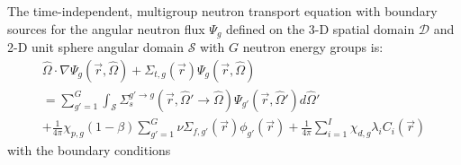 The time-independent, multigroup neutron transport equation with boundary sources for the angular
neutron flux $\Psi_g$ defined on the 3-D spatial domain $\mathcal{D}$ and 2-D unit sphere angular
domain $\mathcal{S}$ with $G$ neutron energy groups is:
%
\begin{multline}
  \hat{\Omega}\cdot\nabla\Psi_g(\vec{r},\hat{\Omega}) + \Sigma_{t,g}(\vec{r})
  \Psi_g(\vec{r},\hat{\Omega}) \\
  = \sum^G_{g'=1}\int_\mathcal{S} \Sigma_s^{g'\rightarrow g}(\vec{r}, \hat{\Omega}'\rightarrow\hat{\Omega})
  \Psi_{g'}(\vec{r},\hat{\Omega}')d\hat{\Omega}' \\
  + \frac{1}{4\pi}\chi_{p,g}(1-\beta)\sum^G_{g'=1} \nu\Sigma_{f,g'}(\vec{r}) \phi_{g'}(\vec{r})
  + \frac{1}{4\pi}\sum^I_{i=1}\chi_{d,g}
  \lambda_i C_i(\vec{r})
  \label{eq:mg-nte}
\end{multline}
%
with the boundary conditions
%
